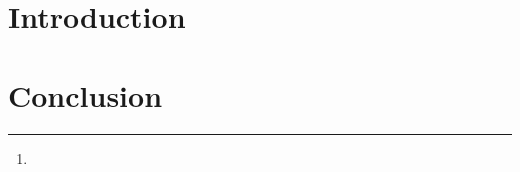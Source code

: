 \documentclass[journal]{IEEEtran}
\begin{document}
\title{}



\author{
  ~\IEEEmembership{}%
\thanks{}
}

\maketitle


\begin{abstract}

\end{abstract}

\begin{IEEEkeywords}

\end{IEEEkeywords}

\IEEEpeerreviewmaketitle



\section{Introduction}

\section{Conclusion}
\end{document}
